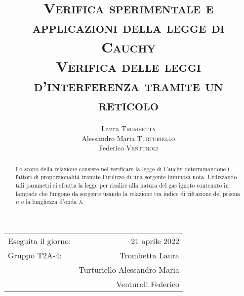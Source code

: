 \documentclass[a4paper,12pt, italian]{article}
\title{\textsc{Verifica sperimentale e applicazioni della legge di Cauchy \\
Verifica delle leggi d'interferenza tramite un reticolo}}
\date{}
\author{Laura \textsc{Trombetta}\\ Alessandro Maria \textsc{Turturiello}\\Federico \textsc{Venturoli}}
\begin{document}
\maketitle 

\begin{center}
\begin{tabular}{l r}
Eseguita il giorno: &  21 aprile 2022 \\ 
Gruppo T2A-4: & Trombetta Laura\\
& Turturiello Alessandro Maria \\
& Venturoli Federico \\ 

\end{tabular}
\end{center}
\begin{abstract}
Lo scopo della relazione consiste nel verificare la legge di Cauchy determinandone i fattori di proporzionalità tramite l'utilizzo di una sorgente luminosa nota. Utilizzando tali parametri si sfrutta la legge per risalire alla natura del gas ignoto contenuto in lampade che fungono da sorgente usando la relazione tra indice di rifrazione del prisma $n$ e la lunghezza d'onda $\lambda$.
\end{abstract}
\tableofcontents
\maketitle
\newpage







\end{document}
